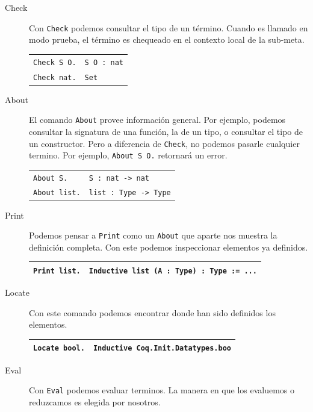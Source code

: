 \begin{description}
  \item[Check] Con \texttt{Check} podemos consultar el tipo de un término. Cuando es llamado en modo prueba, el término es chequeado en el contexto local de la sub-meta.
  \begin{center}
  \begin{tabular}{| l | l |}
  \hline
  \texttt{Check S O.} & \texttt{S O : nat} \\
  \texttt{Check nat.} & \texttt{Set} \\
  \hline
  \end{tabular}
  \end{center}
  \item[About] El comando \texttt{About} provee información general. Por ejemplo, podemos consultar la signatura de una función, la de un tipo, o consultar el tipo de un constructor. Pero a diferencia de \texttt{Check}, no podemos pasarle cualquier termino. Por ejemplo, \texttt{About S O.} retornará un error.
  \begin{center}
  \begin{tabular}{| l | l |}
  \hline
  \texttt{About S.} & \texttt{S : nat -> nat} \\
  \texttt{About list.} & \texttt{list : Type -> Type} \\
  \hline
  \end{tabular}
  \end{center}
  \item[Print] Podemos pensar a \texttt{Print} como un \texttt{About} que aparte nos muestra la definición completa. Con este podemos inspeccionar elementos ya definidos.
  \begin{center}
  \begin{tabular}{| l | l |}
  \hline
  \texttt{Print list.} & \texttt{Inductive list (A : Type) : Type := ...} \\
  \hline
  \end{tabular}
  \end{center}
  \item[Locate] Con este comando podemos encontrar donde han sido definidos los elementos. 
  \begin{center}
  \begin{tabular}{| l | l |}
  \hline
  \texttt{Locate bool.} & \texttt{Inductive Coq.Init.Datatypes.boo} \\
  \hline
  \end{tabular}
  \end{center}
  \item[Eval] Con \texttt{Eval} podemos evaluar terminos. La manera en que los evaluemos o reduzcamos es elegida por nosotros.

\end{description}
